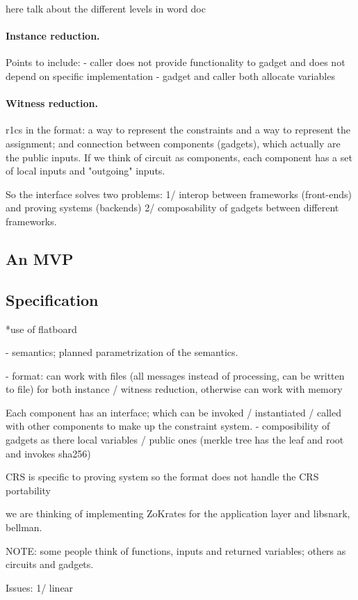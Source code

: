 			here talk about the different levels in word doc

		\paragraph{Instance reduction.} 
		
        Points to include:
        - caller does not provide functionality to gadget and does not depend on specific implementation
        - gadget and caller both allocate variables
		
		\paragraph{Witness reduction.}
		
		r1cs in the format: a way to represent the constraints and a way to represent the assignment; and connection between components (gadgets), which actually are the public inputs. If we think of circuit as components, each component has a set of local inputs and "outgoing" inputs.
		
		So the interface solves two problems: 1/ interop between frameworks (front-ends) and proving systems (backends) 2/ composability of gadgets between different frameworks.
		
	
		
		\subsection{An MVP}
		
		
		
		\subsection{Specification}
		
		*use of flatboard
		
		- semantics; planned parametrization of the semantics.
		
		- format: can work with files (all messages instead of processing, can be written to file) for both instance / witness reduction, otherwise can work with memory 
		
		Each component has an interface; which can be invoked / instantiated / called with other components to make up the constraint system.
			- composibility of gadgets as there local variables / public ones (merkle tree has the leaf and root and invokes sha256)
		
		CRS is specific to proving system so the format does not handle the CRS portability
		
		we are thinking of implementing ZoKrates for the application layer and libsnark, bellman.  
		
		NOTE: some people think of functions, inputs and returned variables; others as circuits and gadgets.
		
		
		Issues: 1/ linear 